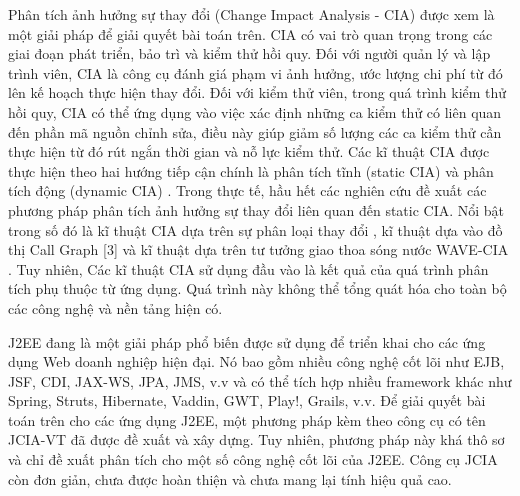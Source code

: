 \documentclass[12pt]{report}
\begin{document}
Phân tích ảnh hưởng sự thay đổi (Change Impact Analysis - CIA) được xem là một
giải pháp để giải quyết bài toán trên. CIA có vai trò quan trọng trong các giai đoạn phát
triển, bảo trì và kiểm thử hồi quy. Đối với người quản lý và lập trình viên, CIA là công cụ
đánh giá phạm vi ảnh hưởng, ước lượng chi phí từ đó lên kế hoạch thực hiện thay đổi.
Đối với kiểm thử viên, trong quá trình kiểm thử hồi quy, CIA có thể ứng dụng vào việc
xác định những ca kiểm thử có liên quan đến phần mã nguồn chỉnh sửa, điều này giúp
giảm số lượng các ca kiểm thử cần thực hiện từ đó rút ngắn thời gian và nỗ lực kiểm thử.
Các kĩ thuật CIA được thực hiện theo hai hướng tiếp cận chính là phân tích tĩnh (static
CIA) và phân tích động (dynamic CIA) \cite{cia-survey}. Trong thực tế, hầu hết các nghiên cứu đề xuất các phương pháp phân tích ảnh hưởng sự thay đổi liên quan đến static CIA. Nổi bật trong
số đó là kĩ thuật CIA dựa trên sự phân loại thay đổi \cite{cia-ct}, kĩ thuật dựa vào đồ thị Call
Graph [3] và kĩ thuật dựa trên tư tưởng giao thoa sóng nước WAVE-CIA \cite{cia-wave}. Tuy nhiên,
Các kĩ thuật CIA sử dụng đầu vào là kết quả của quá trình phân tích phụ thuộc từ ứng
dụng. Quá trình này không thể tổng quát hóa cho toàn bộ các công nghệ và nền tảng hiện
có.

J2EE đang là một giải pháp phổ biến được sử dụng để triển khai cho các ứng dụng Web doanh nghiệp hiện đại. Nó bao gồm nhiều công nghệ cốt lõi như EJB, JSF, CDI, JAX-WS, JPA, JMS, v.v và có thể tích hợp nhiều framework khác như Spring, Struts, Hibernate, Vaddin, GWT, Play!, Grails, v.v. Để giải quyết bài toán trên cho các ứng dụng J2EE, một phương pháp kèm theo công cụ có tên JCIA-VT \cite{cia-uet} đã được đề xuất và xây dựng. Tuy nhiên, phương pháp này khá thô sơ và chỉ đề xuất phân tích cho một số công nghệ cốt lõi của J2EE. Công cụ JCIA còn đơn giản, chưa được hoàn thiện và chưa mang lại tính hiệu quả cao.
\end{document}

